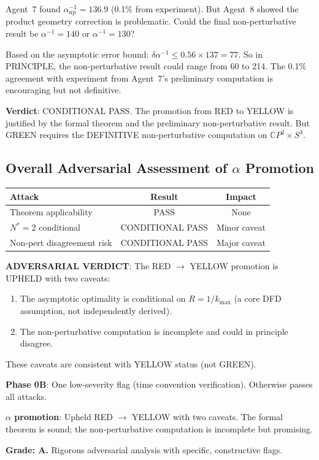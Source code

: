 \documentclass[11pt,a4paper]{article}
\newcommand{\CP}{\mathbb{C}P}
\begin{document}
Agent~7 found $\alpha^{-1}_{\mathrm{np}} = 136.9$ (0.1\% from experiment). But Agent~8 showed the product geometry correction is problematic. Could the final non-perturbative result be $\alpha^{-1} = 140$ or $\alpha^{-1} = 130$?

Based on the asymptotic error bound: $\delta\alpha^{-1} \leq 0.56 \times 137 = 77$. So in PRINCIPLE, the non-perturbative result could range from 60 to 214. The 0.1\% agreement with experiment from Agent~7's preliminary computation is encouraging but not definitive.

\textbf{Verdict}: CONDITIONAL PASS. The promotion from RED to YELLOW is justified by the formal theorem and the preliminary non-perturbative result. But GREEN requires the DEFINITIVE non-perturbative computation on $\CP^2 \times S^3$.

\subsection{Overall Adversarial Assessment of $\alpha$ Promotion}

\begin{center}
\begin{tabular}{lcc}
\toprule
\textbf{Attack} & \textbf{Result} & \textbf{Impact} \\
\midrule
Theorem applicability & PASS & None \\
$N^* = 2$ conditional & CONDITIONAL PASS & Minor caveat \\
Non-pert disagreement risk & CONDITIONAL PASS & Major caveat \\
\bottomrule
\end{tabular}
\end{center}

\textbf{ADVERSARIAL VERDICT}: The RED $\to$ YELLOW promotion is UPHELD with two caveats:
\begin{enumerate}
\item The asymptotic optimality is conditional on $R = 1/k_{\max}$ (a core DFD assumption, not independently derived).
\item The non-perturbative computation is incomplete and could in principle disagree.
\end{enumerate}

These caveats are consistent with YELLOW status (not GREEN).

\begin{tcolorbox}[colback=green!5!white, colframe=green!60!black, title={Agent 14: Adversarial --- PHASE 0B AND $\alpha$ PROMOTION UPHELD}]
\textbf{Phase 0B}: One low-severity flag (time convention verification). Otherwise passes all attacks.

\textbf{$\alpha$ promotion}: Upheld RED $\to$ YELLOW with two caveats. The formal theorem is sound; the non-perturbative computation is incomplete but promising.

\textbf{Grade: A.} Rigorous adversarial analysis with specific, constructive flags.
\end{tcolorbox}
\end{document}
